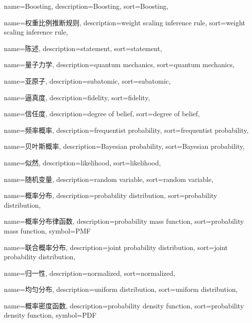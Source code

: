 {
  name=Boosting,
  description={Boosting},
  sort={Boosting},
}

{
  name=权重比例推断规则,
  description={weight scaling inference rule},
  sort={weight scaling inference rule},
}

{
  name=陈述,
  description={statement},
  sort={statement},
}

{
  name=量子力学,
  description={quantum mechanics},
  sort={quantum mechanics},
}

{
  name=亚原子,
  description={subatomic},
  sort={subatomic},
}

{
  name=逼真度,
  description={fidelity},
  sort={fidelity},
}

{
  name=信任度,
  description={degree of belief},
  sort={degree of belief},
}

{
  name=频率概率,
  description={frequentist probability},
  sort={frequentist probability},
}

{
  name=贝叶斯概率,
  description={Bayesian probability},
  sort={Bayesian probability},
}

{
  name=似然,
  description={likelihood},
  sort={likelihood},
}

{
  name=随机变量,
  description={random variable},
  sort={random variable},
}

{
  name=概率分布,
  description={probability distribution},
  sort={probability distribution},
}

{
  name=概率分布律函数,
  description={probability mass function},
  sort={probability mass function},
  symbol={PMF}
}

{
  name=联合概率分布,
  description={joint probability distribution},
  sort={joint probability distribution},
}

{
  name=归一性,
  description={normalized},
  sort={normalized},
}

{
  name=均匀分布,
  description={uniform distribution},
  sort={uniform distribution},
}

{
  name=概率密度函数,
  description={probability density function},
  sort={probability density function},
  symbol={PDF}
}

